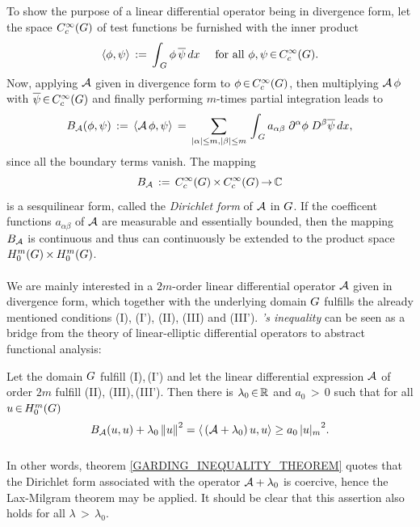 \documentclass[11pt,twoside]{article}
\begin{document}
\subparagraph{}
To show the purpose of a linear differential operator being in divergence form,
let the space $C_c^{\infty}(G)$ of {test functions} be furnished with the inner product
\[
\langle \phi,\psi \rangle \,:=\,
\int_{\,G} \phi \, \overline{\psi} \,dx \quad \mbox{ for all } \phi,\psi {\,\in\,} C_c^{\infty}(G).
\]
Now,
applying ${\mathcal{A}}$ given in divergence form to $\phi {\,\in\,} C_c^{\infty}(G)$,
then multiplying ${\mathcal{A}} \, \phi$ with $\overline{\psi} {\,\in\,} C_c^{\infty}(G)$ and
finally performing $m$-times partial integration leads to
\[
\DF_{\A}(\phi,\psi) \eqdef \scalar{\A \, \phi}{\psi} \=
\sum_{\abs{\alpha} \leq m, \abs{\beta} \leq m} \,
\int_{\,\G}
a_{\alpha \beta} \; \PA \phi \; D^{\beta} \overline{\psi}
\, dx,
\]
since all the boundary terms vanish.
The mapping
\[
B_{{\mathcal{A}}} \,:=\, C_c^{\infty}(G) {\,\times\,} C_c^{\infty}(G) {\,\to\,} {\mathbb{C}}
\]
is a sesquilinear form,
called the \textit{Dirichlet form} of ${\mathcal{A}}$ in $G$.
If the coefficent functions $a_{\alpha \beta}$ of ${\mathcal{A}}$
are measurable and essentially bounded,
then the mapping $B_{{\mathcal{A}}}$ is continuous
and thus can continuously be extended to the product space
$H_0^{m}(G) {\,\times\,} H_0^{m}(G)$.

\paragraph{} %
We are mainly interested in a $2m$-order linear differential operator ${\mathcal{A}}$
given in divergence form,
which together with the underlying domain $G$ fulfills the already 
mentioned conditions (I), (I'), (II), (III) and (III').
\textsc{{\GARDING}}\textit{'s inequality} can be seen as a bridge
from the theory of linear-elliptic differential operators
to abstract functional analysis:

\begin{theorem}\label{GARDING_INEQUALITY_THEOREM}
Let the domain $G$ fulfill (I),\,(I') 
and let the linear differential expression ${\mathcal{A}}$ of order $2m$ fulfill
(II),\,\,(III),\,(III').
Then there is $\lambda_0 {\,\in\,} {\mathbb{R}}$ and $a_0 {\,>\,} 0$ such that
for all $u {\,\in\,} H_0^{m}(G)$
\begin{equation}\label{GARDING_INEQUALITY}
\DF_{\A}(u,u) + \lambda_0 \norm{u}^2 =
\scalar{\,(\A+\lambda_0)\,u}{u} \geq a_0 \, {\abs{u} _m}^2.
\end{equation}
\end{theorem}

\subparagraph{}
In other words,
theorem \ref{GARDING_INEQUALITY_THEOREM} quotes that
the Dirichlet form associated with the operator ${\mathcal{A}} + \lambda_0$ is coercive,
hence the {Lax-Milgram} theorem may be applied.
It should be clear that this assertion also holds
for all $\lambda {\,>\,} \lambda_0$.
\end{document}
